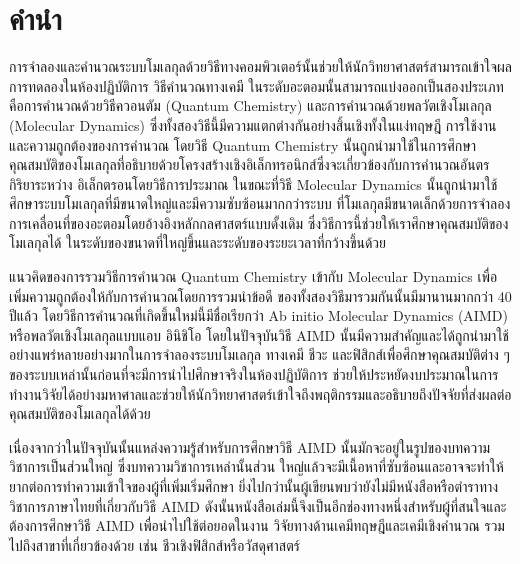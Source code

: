 

{

\chapter*{\centering คำนำ}

การจำลองและคำนวณระบบโมเลกุลด้วยวิธีทางคอมพิวเตอร์นั้นช่วยให้นักวิทยาศาสตร์สามารถเข้าใจผลการทดลองในห้องปฏิบัติการ วิธีคำนวณทางเคมี%
ในระดับอะตอมนั้นสามารถแบ่งออกเป็นสองประเภทคือการคำนวณด้วยวิธีควอนตัม (Quantum Chemistry) และการคำนวณด้วยพลวัตเชิงโมเลกุล 
(Molecular Dynamics) ซึ่งทั้งสองวิธีนี้มีความแตกต่างกันอย่างสิ้นเชิงทั้งในแง่ทฤษฎี การใช้งานและความถูกต้องของการคำนวณ โดยวิธี Quantum 
Chemistry นั้นถูกนำมาใช้ในการศึกษาคุณสมบัติของโมเลกุลที่อธิบายด้วยโครงสร้างเชิงอิเล็กทรอนิกส์ซึ่งจะเกี่ยวข้องกับการคำนวณอันตรกิริยาระหว่าง%
อิเล็กตรอนโดยวิธีการประมาณ ในขณะที่วิธี Molecular Dynamics นั้นถูกนำมาใช้ศึกษาระบบโมเลกุลที่มีขนาดใหญ่และมีความซับซ้อนมากกว่าระบบ%
ที่โมเลกุลมีขนาดเล็กด้วยการจำลองการเคลื่อนที่ของอะตอมโดยอ้างอิงหลักกลศาสตร์แบบดั้งเดิม ซึ่งวิธีการนี้ช่วยให้เราศึกษาคุณสมบัติของโมเลกุลได้%
ในระดับของขนาดที่ใหญ่ขึ้นและระดับของระยะเวลาที่กว้างขึ้นด้วย

แนวคิดของการรวมวิธีการคำนวณ Quantum Chemistry เข้ากับ Molecular Dynamics เพื่อเพิ่มความถูกต้องให้กับการคำนวณโดยการรวมนำข้อดี%
ของทั้งสองวิธีมารวมกันนั้นมีมานานมากกว่า 40 ปีแล้ว โดยวิธีการคำนวณที่เกิดขึ้นใหม่นี้มีชื่อเรียกว่า Ab initio Molecular Dynamics (AIMD) 
หรือพลวัตเชิงโมเลกุลแบบแอบ อินิชิโอ โดยในปัจจุบันวิธี AIMD นั้นมีความสำคัญและได้ถูกนำมาใช้อย่างแพร่หลายอย่างมากในการจำลองระบบโมเลกุล%
ทางเคมี ชีวะ และฟิสิกส์เพื่อศึกษาคุณสมบัติต่าง ๆ ของระบบเหล่านั้นก่อนที่จะมีการนำไปศึกษาจริงในห้องปฏิบัติการ ช่วยให้ประหยัดงบประมาณในการ%
ทำงานวิจัยได้อย่างมหาศาลและช่วยให้นักวิทยาศาสตร์เข้าใจถึงพฤติกรรมและอธิบายถึงปัจจัยที่ส่งผลต่อคุณสมบัติของโมเลกุลได้ด้วย 

เนื่องจากว่าในปัจจุบันนั้นแหล่งความรู้สำหรับการศึกษาวิธี AIMD นั้นมักจะอยู่ในรูปของบทความวิชาการเป็นส่วนใหญ่ ซึ่งบทความวิชาการเหล่านั้นส่วน%
ใหญ่แล้วจะมีเนื้อหาที่ซับซ้อนและอาจจะทำให้ยากต่อการทำความเข้าใจของผู้ที่เพิ่มเริ่มศึกษา ยิ่งไปกว่านั้นผู้เขียนพบว่ายังไม่มีหนังสือหรือตำราทาง%
วิชาการภาษาไทยที่เกี่ยวกับวิธี AIMD ดังนั้นหนังสือเล่มนี้จึงเป็นอีกช่องทางหนึ่งสำหรับผู้ที่สนใจและต้องการศึกษาวิธี AIMD เพื่อนำไปใช้ต่อยอดในงาน%
วิจัยทางด้านเคมีทฤษฎีและเคมีเชิงคำนวณ รวมไปถึงสาขาที่เกี่ยวข้องด้วย เช่น ชีวเชิงฟิสิกส์หรือวัสดุศาสตร์ 

}
